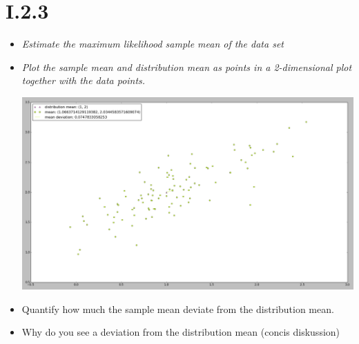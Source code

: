 \documentclass[12pt, a4paper]{article}
\begin{document}
\section{I.2.3}
\begin{itemize}
\item \textit{Estimate the maximum likelihood sample mean of the data set}
\item \textit{Plot the sample mean and distribution mean as points in a 2-dimensional plot
together with the data points.}

\includegraphics[width=\textwidth]{3.png}

\item Quantify how much the sample mean deviate from
the distribution mean.
\item Why do you see a deviation from the distribution mean (concis diskussion)
\end{itemize}
\end{document}
